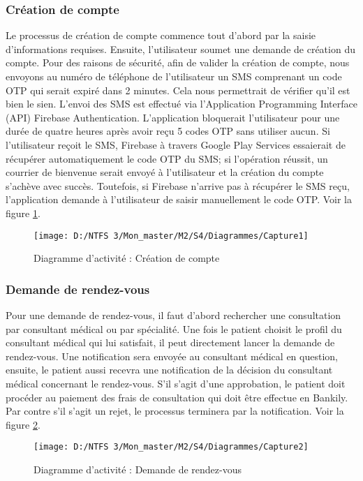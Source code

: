 \subsubsection{Création de compte}
Le processus de création de compte commence tout d’abord par la saisie d’informations requises. Ensuite, l’utilisateur soumet une demande de création du compte. Pour des raisons de sécurité, afin de valider la création de compte, nous envoyons au numéro de téléphone de l’utilisateur un SMS comprenant un code \gls{OTP} qui serait expiré dans 2 minutes. Cela nous permettrait de vérifier qu’il est bien le sien. L’envoi des SMS est effectué via l’Application Programming Interface (\gls{API}) Firebase Authentication. L’application bloquerait l’utilisateur pour une durée de quatre heures après avoir reçu 5 codes \gls{OTP} sans utiliser aucun. Si l’utilisateur reçoit le SMS, Firebase à travers Google Play Services essaierait de récupérer automatiquement le code \gls{OTP} du SMS; si l’opération réussit, un courrier de bienvenue serait envoyé à l’utilisateur et la création du compte s’achève avec succès. Toutefois, si Firebase n’arrive pas à récupérer le SMS reçu, l’application demande à l’utilisateur de saisir manuellement le code \gls{OTP}. Voir la figure \ref{Figure 4.4}.
\begin{figure}[h]
	\texttt{[image: D:/NTFS 3/Mon\_master/M2/S4/Diagrammes/Capture1]}
	\centering
	\caption{Diagramme d'activité : Création de compte}
	\label{Figure 4.4}
\end{figure}

\subsubsection{Demande de rendez-vous}
Pour une demande de rendez-vous, il faut d'abord rechercher une consultation par consultant médical ou par spécialité. Une fois le patient choisit le profil du consultant médical qui lui satisfait, il peut directement lancer la demande de rendez-vous. Une notification sera envoyée au consultant médical en question, ensuite, le patient aussi recevra une notification de la décision du consultant médical concernant le rendez-vous. S'il s'agit d'une approbation, le patient doit procéder au paiement des frais de consultation qui doit être effectue en Bankily. Par contre s'il s'agit un rejet, le processus terminera par la notification. Voir la figure \ref{Figure 4.5}.
\begin{figure}[h]
	\texttt{[image: D:/NTFS 3/Mon\_master/M2/S4/Diagrammes/Capture2]}
	\centering
	\caption{Diagramme d'activité : Demande de rendez-vous}
	\label{Figure 4.5}
\end{figure}

